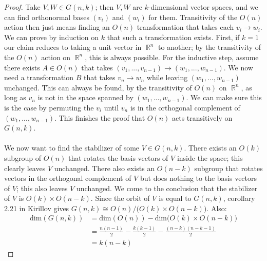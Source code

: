 \documentclass[12 pt]{article}
\DeclareMathOperator {\R} {\mathbb{R}}
\begin{document}
\begin{proof}
Take $V, W \in G(n,k)$; then $V, W$ are $k$-dimensional vector spaces, and we can find orthonormal bases $(v_i)$ and $(w_i)$ for them. Transitivity of the $O(n)$ action then just means finding an $O(n)$ transformation that takes each $v_i \to w_i$. We can prove by induction on $k$ that such a transformation exists. First, if $k=1$ our claim reduces to taking a unit vector in $\R^n$ to another; by the transitivity of the $O(n)$ action on $\R^n$, this is always possible. For the inductive step, assume there exists $A\in O(n)$ that takes $(v_1, ... , v_{n-1}) \to (w_1, ... , w_{n-1})$. We now need a transformation $B$ that takes $v_n \to w_n$ while leaving $(w_1, ... , w_{n-1})$ unchanged. This can always be found, by the transitivity of $O(n)$ on $\R^n$, as long as $v_n$ is not in the space spanned by $(w_1, ... , w_{n-1})$. We can make sure this is the case by permuting the $v_i$ until $v_n$ is in the orthogonal complement of $(w_1, ... , w_{n-1})$. This finishes the proof that $O(n)$ acts transitively on $G(n,k)$.
\\
\\
We now want to find the stabilizer of some $V\in G(n,k)$. There exists an $O(k)$ subgroup of $O(n)$ that rotates the basis vectors of $V$ inside the space; this clearly leaves $V$ unchanged. There also exists an $O(n-k)$ subgroup that rotates vectors in the orthogonal complement of $V$ but does nothing to the basis vectors of $V$; this also leaves $V$ unchanged. We come to the conclusion that the stabilizer of $V$ is $O(k) \times O(n-k)$. Since the orbit of $V$ is equal to $G(n,k)$, corollary 2.21 in Kirillov gives $G(n,k) \cong O(n) / \big(O(k) \times O(n-k)\big)$. Also:
\begin{align*}    
\text{dim}(G(n,k)) &= \text{dim}(O(n)) - \text{dim}\big(O(k) \times O(n-k)\big)  
\\   &= \frac{n(n-1)}{2} - \frac{k(k-1)}{2} - \frac{(n-k)(n-k-1)}{2}  
\\   &= k(n-k)
\end{align*}
\end{proof}
\end{document}
